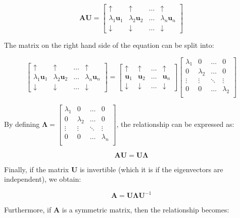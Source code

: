 \documentclass[12pt]{article}
\begin{document}
\[ \mathbf{AU} = \begin{bmatrix}
    \uparrow & \uparrow & \dots & \uparrow \\
    \lambda_1\mathbf{u}_1 & \lambda_2\mathbf{u}_2 & \dots & \lambda_n\mathbf{u}_n \\
    \downarrow & \downarrow & \dots &\downarrow 
\end{bmatrix} \]

The matrix on the right hand side of the equation can be split into:

\[ \begin{bmatrix}
    \uparrow & \uparrow & \dots & \uparrow \\
    \lambda_1\mathbf{u}_1 & \lambda_2\mathbf{u}_2 & \dots & \lambda_n\mathbf{u}_n \\
    \downarrow & \downarrow & \dots &\downarrow 
\end{bmatrix} =  \begin{bmatrix}
    \uparrow & \uparrow & \dots & \uparrow \\
    \mathbf{u}_1 & \mathbf{u}_2 & \dots & \mathbf{u}_n \\
    \downarrow & \downarrow & \dots & \downarrow 
\end{bmatrix} \begin{bmatrix}
    \lambda_1 & 0 & \dots & 0 \\
    0 & \lambda_2 & \dots & 0 \\
    \vdots & \vdots & \ddots & \vdots \\
    0 & 0 & \dots & \lambda_2 \\
\end{bmatrix}\]

By defining $\mathbf{\Lambda} = \begin{bmatrix}
    \lambda_1 & 0 & \dots & 0 \\
    0 & \lambda_2 & \dots & 0 \\
    \vdots & \vdots & \ddots & \vdots \\
    0 & 0 & \dots & \lambda_n \\
\end{bmatrix}$, the relationship can be expressed as:

\[ \mathbf{AU} = \mathbf{U\Lambda} \]

Finally, if the matrix $\mathbf{U}$ is invertible (which it is if the eigenvectors are independent), we obtain:

\[ \mathbf{A} = \mathbf{U\Lambda U}^{-1} \]

Furthermore, if $\mathbf{A}$ is a symmetric matrix, then the relationship becomes:
\end{document}
